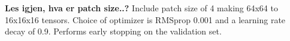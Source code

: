 \textbf{Les igjen, hva er patch size..?}
Include patch size of 4 making 64x64 to 16x16x16 tensors. Choice of optimizer is RMSprop 0.001 and a learning rate decay of 0.9. Performs early stopping on the validation set.




 







